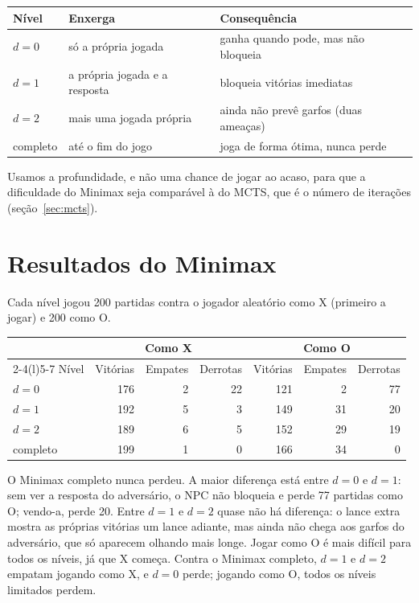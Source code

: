 \documentclass[11pt,a4paper]{article}
\begin{document}
\begin{center}
\begin{tabular}{@{}lll@{}}
\toprule
Nível & Enxerga & Consequência \\
\midrule
$d = 0$ & só a própria jogada & ganha quando pode, mas não bloqueia \\
$d = 1$ & a própria jogada e a resposta & bloqueia vitórias imediatas \\
$d = 2$ & mais uma jogada própria & ainda não prevê garfos (duas ameaças) \\
completo & até o fim do jogo & joga de forma ótima, nunca perde \\
\bottomrule
\end{tabular}
\end{center}

Usamos a profundidade, e não uma chance de jogar ao acaso, para que a
dificuldade do Minimax seja comparável à do MCTS, que é o número de iterações
(seção~\ref{sec:mcts}).

\section{Resultados do Minimax}\label{sec:res-minimax}

Cada nível jogou 200 partidas contra o jogador aleatório como X (primeiro a
jogar) e 200 como O.

\begin{center}
\begin{tabular}{@{}lrrrrrr@{}}
\toprule
 & \multicolumn{3}{c}{Como X} & \multicolumn{3}{c}{Como O} \\
\cmidrule(lr){2-4}\cmidrule(l){5-7}
Nível & Vitórias & Empates & Derrotas & Vitórias & Empates & Derrotas \\
\midrule
$d = 0$  & 176 & 2 & 22 & 121 & 2  & 77 \\
$d = 1$  & 192 & 5 & 3  & 149 & 31 & 20 \\
$d = 2$  & 189 & 6 & 5  & 152 & 29 & 19 \\
completo & 199 & 1 & 0  & 166 & 34 & 0 \\
\bottomrule
\end{tabular}
\end{center}

O Minimax completo nunca perdeu. A maior diferença está entre $d = 0$ e
$d = 1$: sem ver a resposta do adversário, o NPC não bloqueia e perde 77
partidas como O; vendo-a, perde 20. Entre $d = 1$ e $d = 2$ quase não há
diferença: o lance extra mostra as próprias vitórias um lance adiante, mas
ainda não chega aos garfos do adversário, que só aparecem olhando mais longe.
Jogar como O é mais difícil para todos os níveis, já que X começa.
Contra o Minimax completo, $d = 1$ e $d = 2$ empatam jogando como X, e $d = 0$
perde; jogando como O, todos os níveis limitados perdem.
\end{document}
